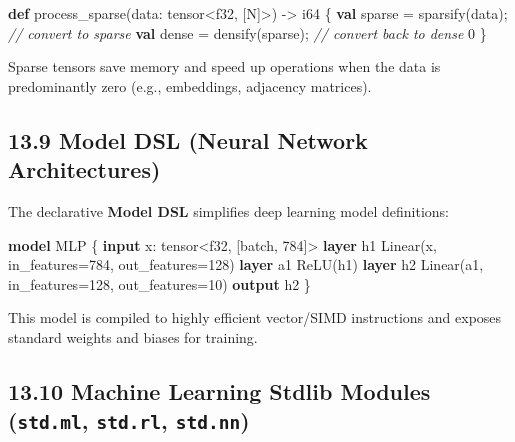 \documentclass[
  english,
]{book}
\newenvironment{Shaded}{\begin{snugshade}}{\end{snugshade}}
\newcommand{\CommentTok}[1]{\textcolor[rgb]{0.42,0.60,0.33}{\textit{#1}}}
\newcommand{\DataTypeTok}[1]{\textcolor[rgb]{0.31,0.79,0.69}{#1}}
\newcommand{\DecValTok}[1]{\textcolor[rgb]{0.71,0.81,0.66}{#1}}
\newcommand{\FunctionTok}[1]{\textcolor[rgb]{0.86,0.86,0.67}{#1}}
\newcommand{\KeywordTok}[1]{\textcolor[rgb]{0.34,0.61,0.84}{\textbf{#1}}}
\newcommand{\NormalTok}[1]{\textcolor[rgb]{0.83,0.83,0.83}{#1}}
\newcommand{\OperatorTok}[1]{\textcolor[rgb]{0.83,0.83,0.83}{#1}}
\begin{document}
\begin{Shaded}
\begin{Highlighting}[]
\KeywordTok{def}\NormalTok{ process\_sparse(data: }\DataTypeTok{tensor}\OperatorTok{\textless{}}\DataTypeTok{f32}\NormalTok{, [N]}\OperatorTok{\textgreater{}}\NormalTok{) }\OperatorTok{{-}\textgreater{}} \DataTypeTok{i64}\NormalTok{ \{}
    \KeywordTok{val} \DataTypeTok{sparse} \OperatorTok{=} \FunctionTok{sparsify}\NormalTok{(data);      }\CommentTok{// convert to sparse}
    \KeywordTok{val}\NormalTok{ dense }\OperatorTok{=} \FunctionTok{densify}\NormalTok{(}\DataTypeTok{sparse}\NormalTok{);      }\CommentTok{// convert back to dense}
    \DecValTok{0}
\NormalTok{\}}
\end{Highlighting}
\end{Shaded}

Sparse tensors save memory and speed up operations when the data is
predominantly zero (e.g., embeddings, adjacency matrices).

\subsection{13.9 Model DSL (Neural Network
Architectures)}\label{model-dsl-neural-network-architectures-1}

The declarative \textbf{Model DSL} simplifies deep learning model
definitions:

\begin{Shaded}
\begin{Highlighting}[]
\KeywordTok{model}\NormalTok{ MLP \{}
    \KeywordTok{input}\NormalTok{ x: }\DataTypeTok{tensor}\OperatorTok{\textless{}}\DataTypeTok{f32}\NormalTok{, [batch, }\DecValTok{784}\NormalTok{]}\OperatorTok{\textgreater{}}
    \KeywordTok{layer}\NormalTok{ h1 Linear(x, in\_features}\OperatorTok{=}\DecValTok{784}\NormalTok{, out\_features}\OperatorTok{=}\DecValTok{128}\NormalTok{)}
    \KeywordTok{layer}\NormalTok{ a1 ReLU(h1)}
    \KeywordTok{layer}\NormalTok{ h2 Linear(a1, in\_features}\OperatorTok{=}\DecValTok{128}\NormalTok{, out\_features}\OperatorTok{=}\DecValTok{10}\NormalTok{)}
    \KeywordTok{output}\NormalTok{ h2}
\NormalTok{\}}
\end{Highlighting}
\end{Shaded}

This model is compiled to highly efficient vector/SIMD instructions and
exposes standard weights and biases for training.

\subsection{\texorpdfstring{13.10 Machine Learning Stdlib Modules
(\texttt{std.ml}, \texttt{std.rl},
\texttt{std.nn})}{13.10 Machine Learning Stdlib Modules (std.ml, std.rl, std.nn)}}\label{machine-learning-stdlib-modules-std.ml-std.rl-std.nn-1}
\end{document}
